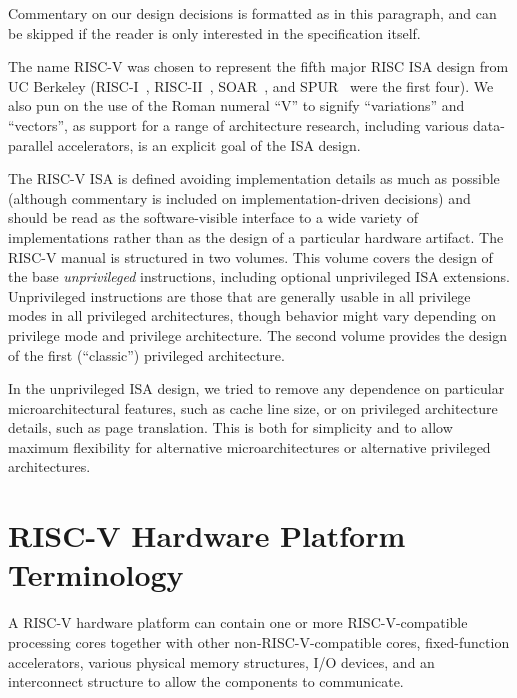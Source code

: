 \begin{commentary}
Commentary on our design decisions is formatted as in this paragraph,
and can be skipped if the reader is only interested in the
specification itself.
\end{commentary}
\begin{commentary}
The name RISC-V was chosen to represent the fifth major RISC ISA
design from UC Berkeley (RISC-I~\cite{riscI-isca1981},
RISC-II~\cite{Katevenis:1983}, SOAR~\cite{Ungar:1984}, and
SPUR~\cite{spur-jsscc1989} were the first four).  We also pun on the
use of the Roman numeral ``V'' to signify ``variations'' and
``vectors'', as support for a range of architecture research,
including various data-parallel accelerators, is an explicit goal of
the ISA design.
\end{commentary}

The RISC-V ISA is defined avoiding implementation details as much as
possible (although commentary is included on implementation-driven
decisions) and should be read as the software-visible interface to a
wide variety of implementations rather than as the design of a
particular hardware artifact.  The RISC-V manual is structured in two
volumes.  This volume covers the design of the base {\em unprivileged}
instructions, including optional unprivileged ISA extensions.
Unprivileged instructions are those that are generally usable in all
privilege modes in all privileged architectures, though behavior might
vary depending on privilege mode and privilege architecture.  The
second volume provides the design of the first (``classic'')
privileged architecture.

\begin{commentary}
In the unprivileged ISA design, we tried to remove any dependence on
particular microarchitectural features, such as cache line size, or on
privileged architecture details, such as page translation.  This is
both for simplicity and to allow maximum flexibility for alternative
microarchitectures or alternative privileged architectures.
\end{commentary}


\section{RISC-V Hardware Platform Terminology}

A RISC-V hardware platform can contain one or more RISC-V-compatible
processing cores together with other non-RISC-V-compatible cores,
fixed-function accelerators, various physical memory structures, I/O
devices, and an interconnect structure to allow the components to
communicate.

